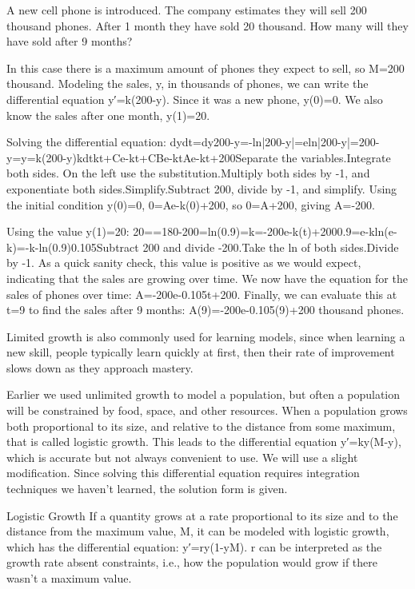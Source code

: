 \begin{example}
A new cell phone is introduced. The company estimates they will sell 200 thousand phones. After 1 month they have sold 20 thousand. How many will they have sold after 9 months?

\begin{solution}
In this case there is a maximum amount of phones they expect to sell, so M=200 thousand. Modeling the sales, y, in thousands of phones, we can write the differential equation
y′=k(200-y).
Since it was a new phone, y(0)=0. We also know the sales after one month, y(1)=20.

Solving the differential equation:
dydt=dy200-y=-ln|200-y|=eln|200-y|=200-y=y=k(200-y)kdtkt+Ce-kt+CBe-ktAe-kt+200Separate the variables.Integrate both sides. On the left use the substitution.Multiply both sides by -1, and exponentiate both sides.Simplify.Subtract 200, divide by -1, and simplify.
Using the initial condition y(0)=0,
0=Ae-k(0)+200,
so 0=A+200, giving A=-200.

Using the value y(1)=20:
20==180-200=ln(0.9)=k=-200e-k(t)+2000.9=e-kln(e-k)=-k-ln(0.9)\approx   0.105Subtract 200 and divide -200.Take the ln of both sides.Divide by -1.
As a quick sanity check, this value is positive as we would expect, indicating that the sales are growing over time. We now have the equation for the sales of phones over time:
A=-200e-0.105t+200.
Finally, we can evaluate this at t=9 to find the sales after 9 months:
A(9)=-200e-0.105(9)+200 thousand phones.
\end{solution}\end{example}

Limited growth is also commonly used for learning models, since when learning a new skill, people typically learn quickly at first, then their rate of improvement slows down as they approach mastery.

Earlier we used unlimited growth to model a population, but often a population will be constrained by food, space, and other resources. When a population grows both proportional to its size, and relative to the distance from some maximum, that is called logistic growth. This leads to the differential equation y′=ky(M-y), which is accurate but not always convenient to use. We will use a slight modification. Since solving this differential equation requires integration techniques we haven't learned, the solution form is given.

Logistic Growth
If a quantity grows at a rate proportional to its size and to the distance from the maximum value, M, it can be modeled with logistic growth, which has the differential equation:
y′=ry(1-yM).
r can be interpreted as the growth rate absent constraints, i.e., how the population would grow if there wasn't a maximum value.

